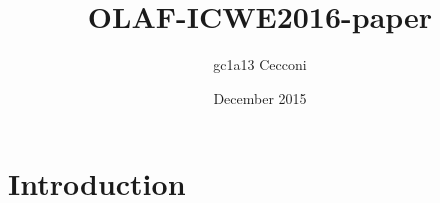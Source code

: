 \documentclass{article}
\title{OLAF-ICWE2016-paper}
\author{gc1a13 Cecconi}
\date{December 2015}
\begin{document}
\maketitle

\section{Introduction}
\end{document}
